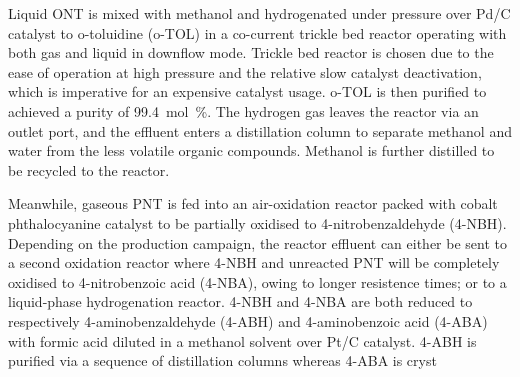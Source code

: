 Liquid ONT is mixed with methanol and hydrogenated under pressure over Pd/C catalyst to o-toluidine (o-TOL) in a co-current trickle bed reactor operating with both gas and liquid in downflow mode. Trickle bed reactor is chosen due to the ease of operation at high pressure and the relative slow catalyst deactivation, which is imperative for an expensive catalyst usage. o-TOL is then purified to achieved a purity of \SI{99.4}{mol\percent}. The hydrogen gas leaves the reactor via an outlet port, and the effluent enters a distillation column to separate methanol and water from the less volatile organic compounds. Methanol is further distilled to be recycled to the reactor. 

Meanwhile, gaseous PNT is fed into an air-oxidation reactor packed with cobalt phthalocyanine catalyst to be partially oxidised to 4-nitrobenzaldehyde (4-NBH). Depending on the production campaign, the reactor effluent can either be sent to a second oxidation reactor where 4-NBH and unreacted PNT will be completely oxidised to 4-nitrobenzoic acid (4-NBA), owing to longer resistence times; or to a liquid-phase hydrogenation reactor. 4-NBH and 4-NBA are both reduced to respectively 4-aminobenzaldehyde (4-ABH) and 4-aminobenzoic acid (4-ABA) with formic acid diluted in a methanol solvent over Pt/C catalyst. 4-ABH is purified via a sequence of distillation columns whereas 4-ABA is cryst





 

